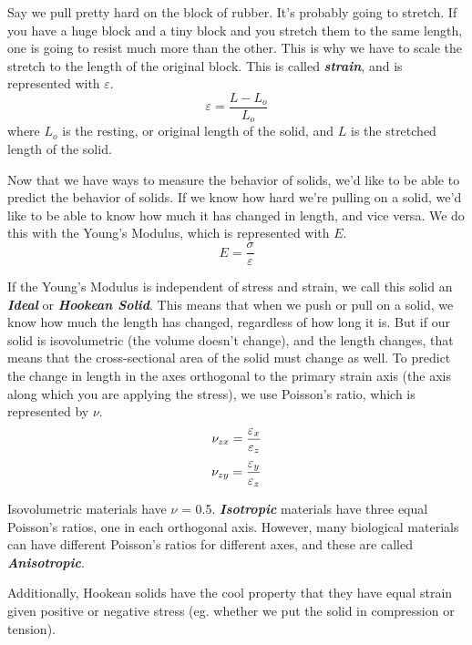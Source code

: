 Say we pull pretty hard on the block of rubber. It's probably going to stretch. If you have a huge block and a tiny block and you stretch them to the same length, one is going to resist much more than the other. This is why we have to scale the stretch to the length of the original block. This is called \emph{\textbf{strain}}, and is represented with $\varepsilon$.
\begin{equation}
\varepsilon = \frac{L-L_o}{L_o}
\end{equation}
where $L_o$ is the resting, or original length of the solid, and $L$ is the stretched length of the solid.

Now that we have ways to measure the behavior of solids, we'd like to be able to predict the behavior of solids. If we know how hard we're pulling on a solid, we'd like to be able to know how much it has changed in length, and vice versa. We do this with the Young's Modulus, which is represented with $E$.
\begin{equation}
E = \frac{\sigma}{\varepsilon}
\end{equation}

If the Young's Modulus is independent of stress and strain, we call this solid an \emph{\textbf{Ideal}} or \emph{\textbf{Hookean Solid}}. This means that when we push or pull on a solid, we know how much the length has changed, regardless of how long it is. But if our solid is isovolumetric (the volume doesn't change), and the length changes, that means that the cross-sectional area of the solid must change as well. To predict the change in length in the axes orthogonal to the primary strain axis (the axis along which you are applying the stress), we use Poisson's ratio, which is represented by $\nu$. 
\begin{equation}
\nu_{zx} = \- \frac{\varepsilon_x}{\varepsilon_z}
\end{equation}
\begin{equation}
\nu_{zy} = \- \frac{\varepsilon_y}{\varepsilon_z}
\end{equation}

Isovolumetric materials have $\nu$ = 0.5. \emph{\textbf{Isotropic}} materials have three equal Poisson's ratios, one in each orthogonal axis. However, many biological materials can have different Poisson's ratios for different axes, and these are called \emph{\textbf{Anisotropic}}.

Additionally, Hookean solids have the cool property that they have equal strain given positive or negative stress (eg. whether we put the solid in compression or tension). 

